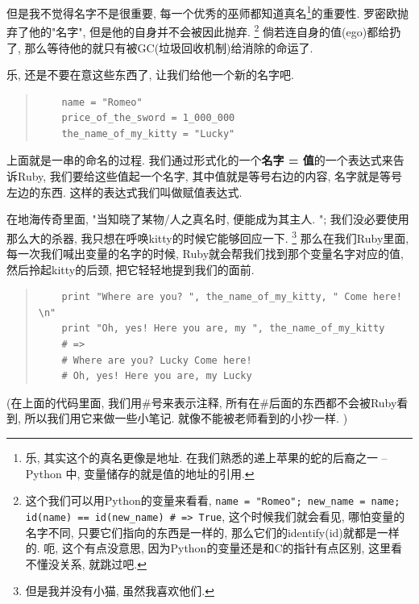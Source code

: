 但是我不觉得名字不是很重要, 每一个优秀的巫师都知道真名\footnote{乐, 其实这个的真名更像是地址. 在我们熟悉的递上苹果的蛇的后裔之一 -- Python 中, 变量储存的就是值的地址的引用. }的重要性. 罗密欧抛弃了他的"名字", 但是他的自身并不会被因此抛弃. \footnote{这个我们可以用Python的变量来看看, \texttt{name = "Romeo"; new_name = name; id(name) == id(new_name) # => True}, 这个时候我们就会看见, 哪怕变量的名字不同, 只要它们指向的东西是一样的, 那么它们的identify(id)就都是一样的. 呃, 这个有点没意思, 因为Python的变量还是和C的指针有点区别, 这里看不懂没关系, 就跳过吧. } 倘若连自身的值(ego)都给扔了, 那么等待他的就只有被GC(垃圾回收机制)给消除的命运了. 

乐, 还是不要在意这些东西了, 让我们给他一个新的名字吧. 

\begin{quotation}
  \begin{verbatim}
    name = "Romeo"
    price_of_the_sword = 1_000_000
    the_name_of_my_kitty = "Lucky"
  \end{verbatim}
\end{quotation}

上面就是一串的命名的过程. 我们通过形式化的一个\textbf{名字 = 值}的一个表达式来告诉Ruby, 我们要给这些值起一个名字, 其中值就是等号右边的内容, 名字就是等号左边的东西. 这样的表达式我们叫做赋值表达式. 

在地海传奇里面, "当知晓了某物/人之真名时, 便能成为其主人. "; 我们没必要使用那么大的杀器, 我只想在呼唤kitty的时候它能够回应一下. \footnote{但是我并没有小猫, 虽然我喜欢他们. } 那么在我们Ruby里面, 每一次我们喊出变量的名字的时候, Ruby就会帮我们找到那个变量名字对应的值, 然后拎起kitty的后颈, 把它轻轻地提到我们的面前. 

\begin{quotation}
  \begin{verbatim}
    print "Where are you? ", the_name_of_my_kitty, " Come here! \n"
    print "Oh, yes! Here you are, my ", the_name_of_my_kitty
    # =>
    # Where are you? Lucky Come here!
    # Oh, yes! Here you are, my Lucky
  \end{verbatim}
\end{quotation}

(在上面的代码里面, 我们用\#号来表示注释, 所有在\#后面的东西都不会被Ruby看到, 所以我们用它来做一些小笔记. 就像不能被老师看到的小抄一样. )

